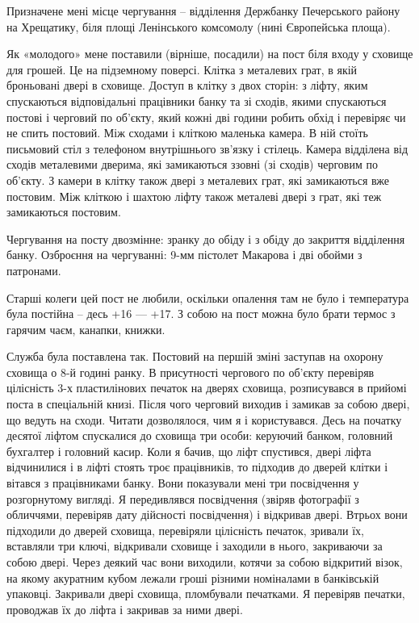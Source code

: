 Призначене мені місце чергування – відділення Держбанку Печерського району на
Хрещатику, біля площі Ленінського комсомолу (нині Європейська площа).

Як «молодого» мене поставили (вірніше, посадили) на пост біля входу у сховище
для грошей. Це на підземному поверсі. Клітка з металевих грат, в якій
броньовані двері в сховище. Доступ в клітку з двох сторін: з ліфту, яким
спускаються відповідальні працівники банку та зі сходів, якими спускаються
постові і черговий по об’єкту, який кожні дві години робить обхід і перевіряє
чи не спить постовий. Між сходами і кліткою маленька камера. В ній стоїть
письмовий стіл з телефоном внутрішнього зв’язку і стілець. Камера відділена від
сходів металевими дверима, які замикаються ззовні (зі сходів) черговим по
об’єкту. З камери в клітку також двері з металевих грат, які замикаються вже
постовим. Між кліткою і шахтою ліфту також металеві двері з грат, які теж
замикаються постовим.

Чергування на посту двозмінне: зранку до обіду і з обіду до закриття відділення
банку. Озброєння на чергуванні: 9-мм пістолет Макарова і дві обойми з
патронами. 

Старші колеги цей пост не любили, оскільки опалення там не було і температура
була постійна – десь +16 — +17. З собою на пост можна було брати термос з
гарячим чаєм, канапки, книжки.

Служба була поставлена так. Постовий на першій зміні заступав на охорону
сховища о 8-й годині ранку. В присутності чергового по об’єкту перевіряв
цілісність 3-х пластилінових печаток на дверях сховища, розписувався в прийомі
поста в спеціальній книзі. Після чого черговий виходив і замикав за собою
двері, що ведуть на сходи. Читати дозволялося, чим я і користувався. Десь на
початку десятої ліфтом спускалися до сховища три особи: керуючий банком,
головний бухгалтер і головний касир. Коли я бачив, що ліфт спустився, двері
ліфта відчинилися і в ліфті стоять троє працівників, то підходив до дверей
клітки і вітався з працівниками банку. Вони показували мені три посвідчення у
розгорнутому вигляді. Я передивлявся посвідчення (звіряв фотографії з
обличчями, перевіряв дату дійсності посвідчення) і відкривав двері. Втрьох вони
підходили до дверей сховища, перевіряли цілісність печаток, зривали їх,
вставляли три ключі, відкривали сховище і заходили в нього, закриваючи за собою
двері. Через деякий час вони виходили, котячи за собою відкритий візок, на
якому акуратним кубом лежали гроші різними номіналами в банківській упаковці.
Закривали двері сховища, пломбували печатками. Я перевіряв печатки, проводжав
їх до ліфта і закривав за ними двері. 

